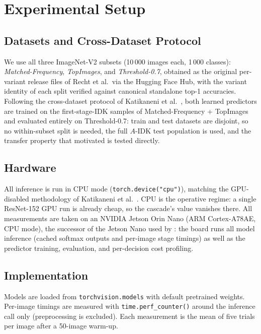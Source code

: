 \documentclass[conference]{IEEEtran}
\begin{document}
\section{Experimental Setup}
\label{sec:setup}

\subsection{Datasets and Cross-Dataset Protocol}
We use all three ImageNet-V2 subsets \cite{recht2019imagenetv2} (10\,000 images each, 1\,000 classes): \textit{Matched-Frequency}, \textit{TopImages}, and \textit{Threshold-0.7}, obtained as the original per-variant release files of Recht et al.\ via the Hugging Face Hub, with the variant identity of each split verified against canonical standalone top-1 accuracies. Following the cross-dataset protocol of Katikaneni et al.\ \cite{katikaneni2025randomforest}, both learned predictors are trained on the first-stage-IDK samples of Matched-Frequency + TopImages and evaluated entirely on Threshold-0.7: train and test datasets are disjoint, so no within-subset split is needed, the full $A$-IDK test population is used, and the transfer property that motivated \cite{katikaneni2025randomforest} is tested directly.

\subsection{Hardware}
All inference is run in CPU mode (\texttt{torch.device("cpu")}), matching the GPU-disabled methodology of Katikaneni et al.\ \cite{katikaneni2025randomforest}. CPU is the operative regime: a single ResNet-152 GPU run is already cheap, so the cascade's value vanishes there. All measurements are taken on an NVIDIA Jetson Orin Nano (ARM Cortex-A78AE, CPU mode), the successor of the Jetson Nano used by \cite{katikaneni2025randomforest}: the board runs all model inference (cached softmax outputs and per-image stage timings) as well as the predictor training, evaluation, and per-decision cost profiling.

\subsection{Implementation}
Models are loaded from \texttt{torchvision.models} with default pretrained weights. Per-image timings are measured with \texttt{time.perf\_counter()} around the inference call only (preprocessing is excluded). Each measurement is the mean of five trials per image after a 50-image warm-up.
\end{document}
